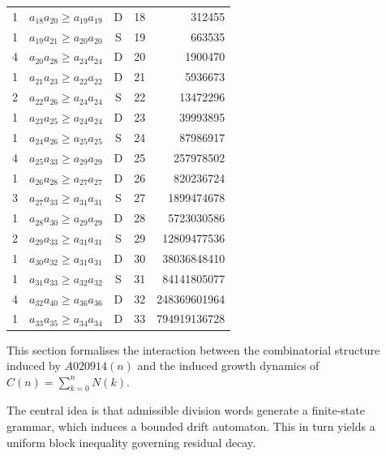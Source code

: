\documentclass[12pt, oneside]{article}
\numberwithin{equation}{section}
\theoremstyle{definition}
\theoremstyle{plain}
\theoremstyle{remark}
\begin{document}
\begin{table}[htbp]
\begin{tabular}{@{}rccrr@{}}
1 & $a_{18} a_{20} \ge a_{19} a_{19}$ & D & 18 &       312455 \\
1 & $a_{19} a_{21} \ge a_{20} a_{20}$ & S & 19 &       663535 \\
4 & $a_{20} a_{28} \ge a_{24} a_{24}$ & D & 20 &      1900470 \\
1 & $a_{21} a_{23} \ge a_{22} a_{22}$ & D & 21 &      5936673 \\
2 & $a_{22} a_{26} \ge a_{24} a_{24}$ & S & 22 &     13472296 \\
1 & $a_{23} a_{25} \ge a_{24} a_{24}$ & D & 23 &     39993895 \\
1 & $a_{24} a_{26} \ge a_{25} a_{25}$ & S & 24 &     87986917 \\
4 & $a_{25} a_{33} \ge a_{29} a_{29}$ & D & 25 &    257978502 \\
1 & $a_{26} a_{28} \ge a_{27} a_{27}$ & D & 26 &    820236724 \\
3 & $a_{27} a_{33} \ge a_{31} a_{31}$ & S & 27 &   1899474678 \\
1 & $a_{28} a_{30} \ge a_{29} a_{29}$ & D & 28 &   5723030586 \\
2 & $a_{29} a_{33} \ge a_{31} a_{31}$ & S & 29 &  12809477536 \\
1 & $a_{30} a_{32} \ge a_{31} a_{31}$ & D & 30 &  38036848410 \\
1 & $a_{31} a_{33} \ge a_{32} a_{32}$ & S & 31 &  84141805077 \\
4 & $a_{32} a_{40} \ge a_{36} a_{36}$ & D & 32 & 248369601964 \\
1 & $a_{33} a_{35} \ge a_{34} a_{34}$ & D & 33 & 794919136728 \\
\bottomrule
\end{tabular}
\end{table}

This section formalises the interaction between the combinatorial
structure induced by $A020914(n)$ and the induced growth dynamics
of $C(n) = \sum_{k=0}^n N(k)$.

The central idea is that admissible division words generate a
finite-state grammar, which induces a bounded drift automaton.
This in turn yields a uniform block inequality governing residual decay.

\clearpage


\end{document}
